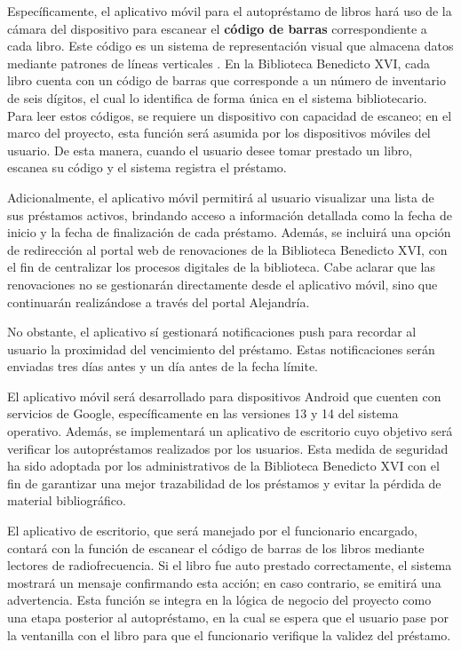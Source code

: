 \documentclass[spanish]{ieee_upb}
\begin{document}
Específicamente, el aplicativo móvil para el autopréstamo de libros hará uso de la cámara del dispositivo para escanear el \textbf{código de barras} correspondiente a cada libro. Este código es un sistema de representación visual que almacena datos mediante patrones de líneas verticales \cite{economipedia_codigo_de_barras}. En la Biblioteca Benedicto XVI, cada libro cuenta con un código de barras que corresponde a un número de inventario de seis dígitos, el cual lo identifica de forma única en el sistema bibliotecario. Para leer estos códigos, se requiere un dispositivo con capacidad de escaneo; en el marco del proyecto, esta función será asumida por los dispositivos móviles del usuario. De esta manera, cuando el usuario desee tomar prestado un libro, escanea su código y el sistema registra el préstamo.\vspace{0.3 cm}

Adicionalmente, el aplicativo móvil permitirá al usuario visualizar una lista de sus préstamos activos, brindando acceso a información detallada como la fecha de inicio y la fecha de finalización de cada préstamo. Además, se incluirá una opción de redirección al portal web de renovaciones de la Biblioteca Benedicto XVI, con el fin de centralizar los procesos digitales de la biblioteca. Cabe aclarar que las renovaciones no se gestionarán directamente desde el aplicativo móvil, sino que continuarán realizándose a través del portal Alejandría.\vspace{0.3 cm}

No obstante, el aplicativo sí gestionará notificaciones push para recordar al usuario la proximidad del vencimiento del préstamo. Estas notificaciones serán enviadas tres días antes y un día antes de la fecha límite.\vspace{0.3 cm}

El aplicativo móvil será desarrollado para dispositivos Android que cuenten con servicios de Google, específicamente en las versiones 13 y 14 del sistema operativo. Además, se implementará un aplicativo de escritorio cuyo objetivo será verificar los autopréstamos realizados por los usuarios. Esta medida de seguridad ha sido adoptada por los administrativos de la Biblioteca Benedicto XVI con el fin de garantizar una mejor trazabilidad de los préstamos y evitar la pérdida de material bibliográfico.\vspace{0.3 cm}

El aplicativo de escritorio, que será manejado por el funcionario encargado, contará con la función de escanear el código de barras de los libros mediante lectores de radiofrecuencia. Si el libro fue auto prestado correctamente, el sistema mostrará un mensaje confirmando esta acción; en caso contrario, se emitirá una advertencia. Esta función se integra en la lógica de negocio del proyecto como una etapa posterior al autopréstamo, en la cual se espera que el usuario pase por la ventanilla con el libro para que el funcionario verifique la validez del préstamo.\vspace{0.3 cm}
\end{document}
